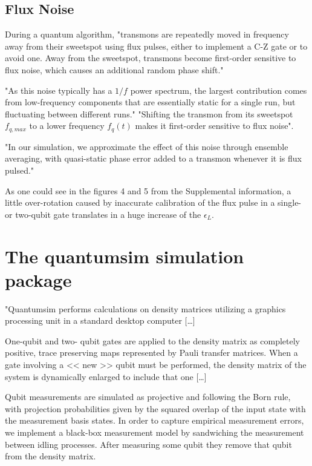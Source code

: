 \documentclass[11pt]{article}
\begin{document}
\subsection{Flux Noise}
\label{sec:org18b5b8f}

During a quantum algorithm, "transmons are repeatedly moved in frequency away from their sweetspot using flux pulses, either to implement a C-Z gate or to avoid one. Away from the sweetspot, transmons become first-order sensitive to flux noise, which causes an additional random phase shift."

"As this noise typically has a \(1/f\) power spectrum, the largest contribution comes from low-frequency components that are essentially static for a single run, but fluctuating between different runs."
"Shifting the transmon from its sweetspot \(f_{q,max}\) to a lower frequency \(f_q (t)\) makes it first-order sensitive to flux noise".

"In our simulation, we approximate the effect of this noise through ensemble averaging, with quasi-static phase error added to a transmon whenever it is flux pulsed."

As one could see in the figures 4 and 5 from the Supplemental information, a little over-rotation  caused by inaccurate calibration of the flux pulse in a single- or two-qubit gate translates in a huge increase of the \(\epsilon_L\).

\section{The quantumsim simulation package}
\label{sec:orgb962fac}

"Quantumsim performs calculations on density matrices utilizing a graphics processing unit in a standard desktop computer [\ldots{}]

One-qubit and two- qubit gates are applied to the density matrix as completely positive, trace preserving maps represented by Pauli transfer matrices. When a gate involving a << new >> qubit must be performed, the density matrix of the system is dynamically enlarged to include that one [\ldots{}]

Qubit measurements are simulated as projective and following the Born rule, with projection probabilities given by the squared overlap of the input state with the measurement basis states. In order to capture empirical measurement errors, we implement a black-box measurement model by sandwiching the measurement between idling processes. After measuring some qubit they remove that qubit from the density matrix.
\end{document}
